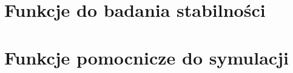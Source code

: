 \documentclass[a4paper,titlepage,11pt,floatssmall]{mwrep}
\begin{document}


\section{Funkcje do badania stabilności}





\section{Funkcje pomocnicze do symulacji}




\end{document}
